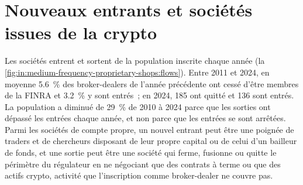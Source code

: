 \begin{omfigure}

\label{fig:in:medium-frequency-proprietary-shops:ccdf}
\end{omfigure}

\section{Nouveaux entrants et sociétés issues de la crypto}

Les sociétés entrent et sortent de la population inscrite chaque année
(la \cref{fig:in:medium-frequency-proprietary-shops:flows}). Entre 2011 et 2024, en moyenne 5.6~\% des broker-dealers de l'année précédente
ont cessé d'être membres de la FINRA et 3.2~\% y sont entrés~; en 2024, 185 ont quitté et 136 sont entrés.
La population a diminué de 29~\% de 2010 à 2024 parce que les sorties ont dépassé les entrées chaque année, et non parce que les entrées se sont arrêtées. Parmi
les sociétés de compte propre, un nouvel entrant peut être une poignée de traders et de chercheurs disposant de leur propre capital ou de celui d'un bailleur de fonds,
et une sortie peut être une société qui ferme, fusionne ou quitte le périmètre du régulateur en ne négociant que des contrats à terme ou que des actifs
crypto, activité que l'inscription comme broker-dealer ne couvre pas.

